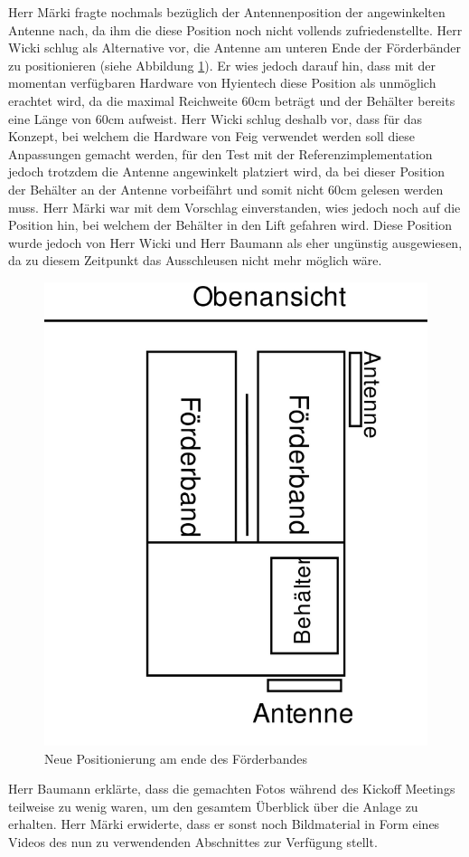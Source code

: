 \documentclass[parskip=full, a4paper]{scrreprt}
\begin{document}
Herr Märki fragte nochmals bezüglich der Antennenposition der angewinkelten Antenne nach, da ihm die diese Position noch nicht vollends zufriedenstellte. Herr Wicki schlug als Alternative vor, die Antenne am unteren Ende der Förderbänder zu positionieren (siehe Abbildung \ref{fig:neueAntennenposition}). Er wies jedoch darauf hin, dass mit der momentan verfügbaren Hardware von Hyientech diese Position als unmöglich erachtet wird, da die maximal Reichweite 60cm beträgt und der Behälter bereits eine Länge von 60cm aufweist. Herr Wicki schlug deshalb vor, dass für das Konzept, bei welchem die Hardware von Feig verwendet werden soll diese Anpassungen gemacht werden, für den Test mit der Referenzimplementation jedoch trotzdem die Antenne angewinkelt platziert wird, da bei dieser Position der Behälter an der Antenne vorbeifährt und somit nicht 60cm gelesen werden muss. Herr Märki war mit dem Vorschlag einverstanden, wies jedoch noch auf die Position hin, bei welchem der Behälter in den Lift gefahren wird. Diese Position wurde jedoch von Herr Wicki und Herr Baumann als eher ungünstig ausgewiesen, da zu diesem Zeitpunkt das Ausschleusen nicht mehr möglich wäre.
\begin{figure}[htb]
	\centering
	\includegraphics[keepaspectratio,width=.6\linewidth]{img/AntennenPositionNeu}
	\caption{Neue Positionierung am ende des Förderbandes}
	\label{fig:neueAntennenposition}
\end{figure}

Herr Baumann erklärte, dass die gemachten Fotos während des Kickoff Meetings teilweise zu wenig waren, um den gesamtem Überblick über die Anlage zu erhalten. Herr Märki erwiderte, dass er sonst noch Bildmaterial in Form eines Videos des nun zu verwendenden Abschnittes zur Verfügung stellt.
\end{document}
